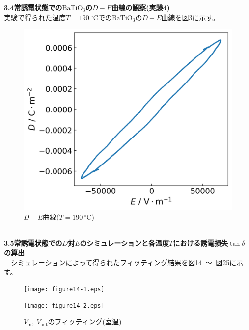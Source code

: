 \documentclass[a4paper,10.5pt]{ltjsarticle}
\begin{document}
{\large \bfseries 3.4常誘電状態での$\mathrm{BaTiO_3}$の$D-E$曲線の観察(実験4)}\\
実験で得られた温度$T=190\ ^\circ \mathrm{C}$での$\mathrm{BaTiO_3}$の$D-E$曲線を図3に示す。
\begin{figure}[h]
  \centering
  \includegraphics[scale=0.5]{figure13.png}
  \caption{$D-E$曲線($T=190\ ^\circ \mathrm{C}$)}
\end{figure}
\\
{\large \bfseries 3.5常誘電状態での$D$対$E$のシミュレーションと各温度$T$における誘電損失$\tan{\delta}$の算出}\\
　シミュレーションによって得られたフィッティング結果を図14\ 〜\ 図25に示す。

\begin{figure}[htbp]
  \begin{minipage}[h]{0.50\linewidth}
    \centering
    \texttt{[image: figure14-1.eps]}
  \end{minipage}
  \begin{minipage}[h]{0.50\linewidth}
    \centering
    \texttt{[image: figure14-2.eps]}
  \end{minipage}
  \caption{$V_\mathrm{in},\ V_\mathrm{out}$のフィッティング(室温)}
\end{figure}
\end{document}
